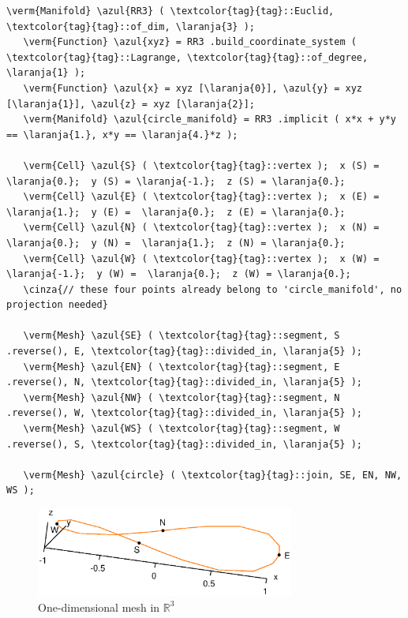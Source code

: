 \begin{Verbatim}[commandchars=\\\{\},formatcom=\small\tt,frame=single,
   label=parag-\ref{\numb section 2.\numb parag 15}.cpp,rulecolor=\color{moldura},
   baselinestretch=0.94,framesep=2mm]
   \verm{Manifold} \azul{RR3} ( \textcolor{tag}{tag}::Euclid, \textcolor{tag}{tag}::of_dim, \laranja{3} );
   \verm{Function} \azul{xyz} = RR3 .build_coordinate_system ( \textcolor{tag}{tag}::Lagrange, \textcolor{tag}{tag}::of_degree, \laranja{1} );
   \verm{Function} \azul{x} = xyz [\laranja{0}], \azul{y} = xyz [\laranja{1}], \azul{z} = xyz [\laranja{2}];
   \verm{Manifold} \azul{circle_manifold} = RR3 .implicit ( x*x + y*y == \laranja{1.}, x*y == \laranja{4.}*z );

   \verm{Cell} \azul{S} ( \textcolor{tag}{tag}::vertex );  x (S) =  \laranja{0.};  y (S) = \laranja{-1.};  z (S) = \laranja{0.};
   \verm{Cell} \azul{E} ( \textcolor{tag}{tag}::vertex );  x (E) =  \laranja{1.};  y (E) =  \laranja{0.};  z (E) = \laranja{0.};
   \verm{Cell} \azul{N} ( \textcolor{tag}{tag}::vertex );  x (N) =  \laranja{0.};  y (N) =  \laranja{1.};  z (N) = \laranja{0.};
   \verm{Cell} \azul{W} ( \textcolor{tag}{tag}::vertex );  x (W) = \laranja{-1.};  y (W) =  \laranja{0.};  z (W) = \laranja{0.};
   \cinza{// these four points already belong to 'circle_manifold', no projection needed}

   \verm{Mesh} \azul{SE} ( \textcolor{tag}{tag}::segment, S .reverse(), E, \textcolor{tag}{tag}::divided_in, \laranja{5} );
   \verm{Mesh} \azul{EN} ( \textcolor{tag}{tag}::segment, E .reverse(), N, \textcolor{tag}{tag}::divided_in, \laranja{5} );
   \verm{Mesh} \azul{NW} ( \textcolor{tag}{tag}::segment, N .reverse(), W, \textcolor{tag}{tag}::divided_in, \laranja{5} );
   \verm{Mesh} \azul{WS} ( \textcolor{tag}{tag}::segment, W .reverse(), S, \textcolor{tag}{tag}::divided_in, \laranja{5} );

   \verm{Mesh} \azul{circle} ( \textcolor{tag}{tag}::join, SE, EN, NW, WS );
\end{Verbatim}

\begin{figure}[ht] \centering
  \includegraphics[width=85mm]{circle-3d}
  \caption{One-dimensional mesh in $ {\mathbb R}^3 $}
  \label{\numb section 2.\numb fig 18}
\end{figure}

